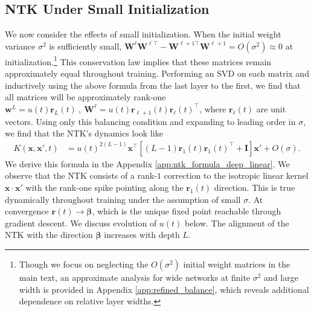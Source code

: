 \documentclass{article} %
\def\x{\bm x}
\begin{document}
\subsection{NTK Under Small Initialization}\label{sec:small_init}
We now consider the effects of small initialization. When the initial weight variance $\sigma^2$ is sufficiently small, $\bm W^{\ell} \bm W^{\ell \top} - \bm W^{\ell+1 \top} \bm W^{\ell + 1} = O(\sigma^2 ) \approx 0$ at initialization.\footnote{Though we focus on neglecting the $O(\sigma^2)$ initial weight matrices in the main text, an approximate analysis for wide networks at finite $\sigma^2$ and large width is provided in Appendix \ref{app:refined_balance}, which reveals additional dependence on relative layer widths.} 
This conservation law implies that these matrices remain approximately equal throughout training. Performing an SVD on each matrix and inductively using the above formula from the last layer to the first, we find that all matrices will be approximately rank-one $\bm w^{L} =  u(t) \bm r_{L}(t) \ , \ \bm W^{\ell} = u(t) \bm r_{\ell+1}(t) \bm r_{\ell}(t)^\top$, where $\bm r_{\ell}(t)$ are unit vectors. Using only this balancing condition and expanding to leading order in $\sigma$, we find that the NTK's dynamics look like
\begin{align}
    K(\bm x, \bm x', t) &=  u(t)^{2(L-1)} \x^\top \left[ (L-1) \bm r_1(t) \bm r_1(t)^\top +  \bm I \right] \x'  + O(\sigma).
\end{align}
We derive this formula in the Appendix \ref{app:ntk_formula_deep_linear}. We observe that the NTK consists of a rank-$1$ correction to the isotropic linear kernel $\x \cdot \x'$ with the rank-one spike pointing along the $\bm r_{1}(t)$ direction. This is true dynamically throughout training under the assumption of small $\sigma$. At convergence $\bm r(t) \to \bm\beta$, which is the unique fixed point reachable through gradient descent. We discuss evolution of $u(t)$ below. The alignment of the NTK with the direction $\bm\beta$ increases with depth $L$. 

\end{document}
